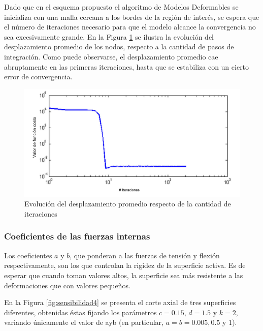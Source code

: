 Dado que en el esquema propuesto el algoritmo de Modelos Deformables se inicializa con una malla cercana a los bordes de la región de interés, se espera que el número de iteraciones necesario para que el modelo alcance la convergencia no sea excesivamente grande. En la Figura \ref{fig:convergencia} se ilustra la evolución del desplazamiento promedio de los nodos, respecto a la cantidad de pasos de integración. Como puede observarse, el desplazamiento promedio cae abruptamente en las primeras iteraciones, hasta que se estabiliza con un cierto error de convergencia.

\begin{figure}[h!]
	\centering
	\includegraphics[scale=0.08]{images/grafico_costo_con_carteles.jpg}
	\caption{Evolución del desplazamiento promedio respecto de la cantidad de iteraciones}
	\label{fig:convergencia}
\end{figure}

\subsubsection{Coeficientes de las fuerzas internas}
Los coeficientes $a$ y $b$, que ponderan a las fuerzas de tensión y flexión respectivamente, son
los que controlan la rigidez de la superficie activa. Es de esperar que cuando toman valores altos, la superficie sea más resistente a las deformaciones que con valores pequeños. 

En la Figura \ref{fig:sensibilidad4} se presenta el corte axial de tres superficies diferentes, obtenidas éstas fijando los parámetros $c=0.15$, $d=1.5$ y $k=2$, variando únicamente el valor de ayb (en particular, $a=b=0.005, 0.5 \text{ y } 1$).

